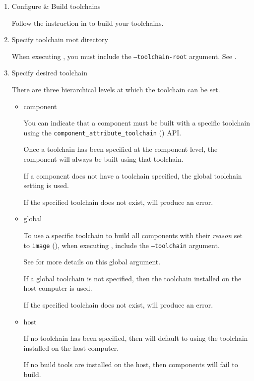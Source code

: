 \begin{enumerate}
\item Configure \& Build toolchains

  Follow the instruction in  to
  build your toolchains.

\item Specify toolchain root directory

  When executing \lmsbw, you must include the
  \texttt{--toolchain-root} argument.  See
  .

\item Specify desired toolchain

  There are three hierarchical levels at which the toolchain can be set.

  \begin{itemize}
  \item component

    You can indicate that a component must be built with a specific
    toolchain using the \texttt{component\_attribute\_toolchain}
    () API.

    Once a toolchain has been specified at the component level, the
    component will always be built using that toolchain.

    If a component does not have a toolchain specified, the global
    toolchain setting is used.

    If the specified toolchain does not exist, \lmsbw will produce an
    error.

  \item global

    To use a specific toolchain to build all components with their
    \emph{reason} set to \texttt{image} (),
    when executing \lmsbw, include the \texttt{--toolchain} argument.

    See  for more details on this global
    argument.

    If a global toolchain is not specified, then the toolchain
    installed on the host computer is used.

    If the specified toolchain does not exist, \lmsbw will produce an
    error.

  \item host

    If no toolchain has been specified, then \lmsbw will default to
    using the toolchain installed on the host computer.

    If no build tools are installed on the host, then components will
    fail to build.

  \end{itemize}

\end{enumerate}

